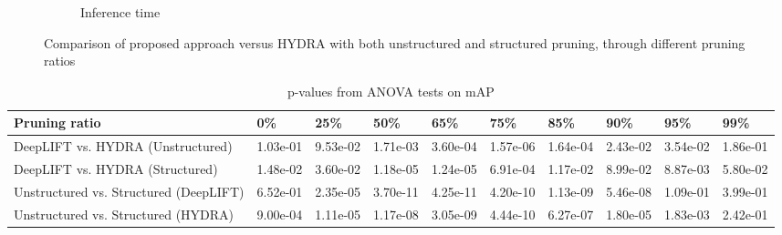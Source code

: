 \documentclass[journal,onecolumn,12pt]{IEEEtran}
\begin{document}
\begin{figure}
\begin{subfigure}[b]{.5\textwidth}
      \caption{Inference time}
      \label{fig:time1}
    \end{subfigure}
    \caption{Comparison of proposed approach versus HYDRA with both unstructured and structured pruning, through different pruning ratios}
    \label{fig:result1}
\end{figure}

\begin{table}[htbp]
    \caption{p-values from ANOVA tests on mAP}
    \begin{center}
    \begin{tabular}{ |p{3cm}|p{1.2cm}|p{1.2cm}|p{1.2cm}|p{1.2cm}|p{1.2cm}|p{1.2cm}|p{1.2cm}|p{1.2cm}|p{1.2cm}|  }
     \hline
     Pruning ratio  & 0\% & 25\%& 50\%& 65\%& 75\%& 85\%& 90\%& 95\%& 99\%\\
     \hline
     DeepLIFT vs. HYDRA (Unstructured)    & 1.03e-01& 9.53e-02& 1.71e-03& 3.60e-04& 1.57e-06& 1.64e-04& 2.43e-02& 3.54e-02& 1.86e-01 \\
     DeepLIFT vs. HYDRA (Structured)     & 1.48e-02& 3.60e-02& 1.18e-05& 1.24e-05& 6.91e-04& 1.17e-02& 8.99e-02& 8.87e-03& 5.80e-02\\
     \hline
     Unstructured vs. Structured (DeepLIFT)      & 6.52e-01& 2.35e-05& 3.70e-11& 4.25e-11&4.20e-10& 1.13e-09& 5.46e-08& 1.09e-01&3.99e-01 \\
     Unstructured vs. Structured (HYDRA)    & 9.00e-04& 1.11e-05& 1.17e-08& 3.05e-09&4.44e-10& 6.27e-07& 1.80e-05& 1.83e-03&2.42e-01\\
     \hline
    \end{tabular}
    \end{center}
    \label{tab:p-mAP}
\end{table}
\end{document}
